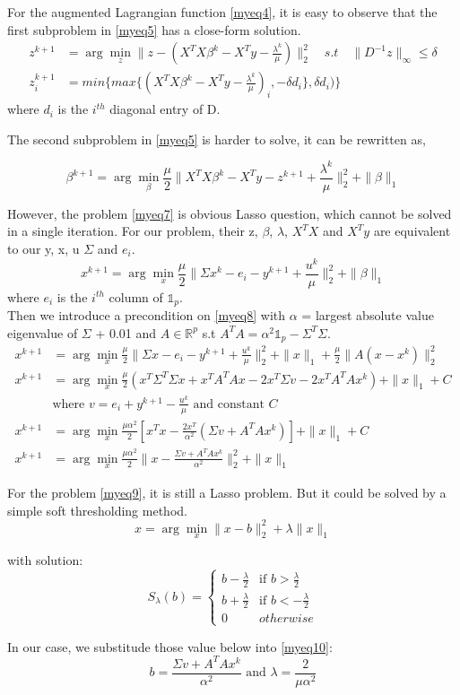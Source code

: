 \documentclass[a4paper,11pt]{article}
\begin{document}
	For the augmented Lagrangian function \eqref{myeq4}, it is easy to observe that the first subproblem in \eqref{myeq5} has a close-form solution.
	\begin{align*}
	z^{k+1} &= \arg\!\min_z \|z - (X^TX\beta^{k}-X^Ty-\frac{\lambda^k}{\mu})\|_{2}^2 \quad s.t \quad \|D^{-1}z\|_\infty \leq \delta\\
	z^{k+1}_i &= min\{max\{(X^TX\beta^{k}-X^Ty-\frac{\lambda^k}{\mu})_i,-\delta{d}_i\}, \delta{d}_i)\}
	\tag{6}\label{myeq6}
	\end{align*}
	where $d_i$ is the $i^{th}$ diagonal entry of D.
	
	The second subproblem in \eqref{myeq5} is harder to solve, it can be rewritten as, 
	
	\[
	\beta^{k+1} = \arg\!\min_\beta \frac{\mu}{2}\|X^TX\beta^{k}-X^Ty-z^{k+1}+\frac{\lambda^k}{\mu}\|_{2}^2 + \|\beta\|_1
	\tag{7}\label{myeq7}
	\]
	
	However, the problem \eqref{myeq7} is obvious Lasso question, which cannot be solved in a single iteration. For our problem, their z, $\beta$, $\lambda$,  $X^TX$ and $X^Ty$ are equivalent to our y, x, u $\Sigma$ and $e_i$.
	\[
	x^{k+1} = \arg\!\min_x \frac{\mu}{2}\|\Sigma{x}^{k}-e_i-y^{k+1}+\frac{u^k}{\mu}\|_{2}^2 + \|\beta\|_1
	\tag{8}\label{myeq8}
	\]
	where $e_i$ is the $i^{th}$ column of $\mathds{1}_p $.\\
	
	Then we introduce a precondition on \eqref{myeq8} with $\alpha$ =  largest absolute value eigenvalue of $\Sigma$ + 0.01 and $A \in \mathbb{R}^p$ s.t $A^TA = \alpha^2\mathds{1}_p - \Sigma^T\Sigma$.
	\begin{align*}
	x^{k+1} &= \arg\!\min_x \frac{\mu}{2}\|\Sigma{x}-e_i-y^{k+1}+\frac{u^k}{\mu}\|_{2}^2 + \|x\|_1 +\frac{\mu}{2}\|A(x-x^k)\|_{2}^2\\
	x^{k+1} &= \arg\!\min_x \frac{\mu}{2}(x^T\Sigma^T\Sigma{x} + x^TA^TA{x}-2x^T\Sigma{v} - 2x^TA^TA{x^k})+ \|x\|_1 + C\\
	&\text{where } v = e_i+y^{k+1}-\frac{u^k}{\mu} \text{ and constant } C\\
	x^{k+1} &= \arg\!\min_x \frac{\mu\alpha^2}{2}[x^Tx-\frac{2x^T}{\alpha^2}(\Sigma{v}+A^TA{x^k})]+ \|x\|_1+C\\
	x^{k+1} &= \arg\!\min_x \frac{\mu\alpha^2}{2}\|x-\frac{\Sigma{v}+A^TA{x^k}}{\alpha^2}\|_{2}^2+ \|x\|_1
	\tag{9}\label{myeq9}
	\end{align*}
	
	For the problem \eqref{myeq9}, it is still a Lasso problem. But it could be solved by a simple soft thresholding method. 
	\[
	x = \arg\!\min_x \|x-b\|_{2}^2 +\lambda\|x\|_1
	\]
	
	with solution:
	\[
	S_\lambda(b)=
	\begin{cases}
	b - \frac{\lambda}{2} & \text{if } b > \frac{\lambda}{2}\\
	b + \frac{\lambda}{2} & \text{if } b < -\frac{\lambda}{2}\\
	0 & otherwise
	\end{cases}
	\tag{10}\label{myeq10}
	\]
	
	In our case, we substitude those value below into \eqref{myeq10}:
	$$b = \frac{\Sigma{v}+A^TA{x^k}}{\alpha^2} \text{ and } \lambda = \frac{2}{\mu\alpha^2}$$ 
\end{document}
